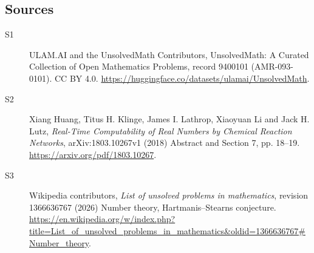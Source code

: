 \documentclass[11pt]{article}
\begin{document}
\subsection{Sources}
\begin{description}
\item[\hypertarget{source:9400101:1}{S1}] ULAM.AI and the UnsolvedMath Contributors, UnsolvedMath: A Curated Collection of Open Mathematics Problems, record 9400101 (AMR-093-0101). CC BY 4.0. \url{https://huggingface.co/datasets/ulamai/UnsolvedMath}.
\item[\hypertarget{source:9400101:2}{S2}] Xiang Huang, Titus H. Klinge, James I. Lathrop, Xiaoyuan Li and Jack H. Lutz, \emph{Real-Time Computability of Real Numbers by Chemical Reaction Networks}, arXiv:1803.10267v1 (2018) Abstract and Section 7, pp. 18--19. \url{https://arxiv.org/pdf/1803.10267}.
\item[\hypertarget{source:9400101:3}{S3}] Wikipedia contributors, \emph{List of unsolved problems in mathematics}, revision 1366636767 (2026) Number theory, Hartmanis–Stearns conjecture. \url{https://en.wikipedia.org/w/index.php?title=List_of_unsolved_problems_in_mathematics&oldid=1366636767#Number_theory}.
\end{description}
\label{end:9400101}
\end{document}
